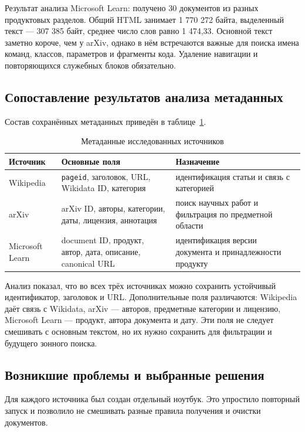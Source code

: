 \documentclass[pdf,unicode,12pt,a4paper,oneside,fleqn]{article}
\begin{document}
Результат анализа Microsoft Learn: получено 30 документов из разных продуктовых
разделов. Общий HTML занимает 1 770 272 байта, выделенный текст --- 307 385 байт,
среднее число слов равно 1 474,33. Основной текст заметно короче, чем у arXiv,
однако в нём встречаются важные для поиска имена команд, классов, параметров и
фрагменты кода. Удаление навигации и повторяющихся служебных блоков обязательно.

\subsection{Сопоставление результатов анализа метаданных}

Состав сохранённых метаданных приведён в таблице~\ref{tab:metadata}.

\begin{table}[htbp]
\centering
\caption{Метаданные исследованных источников}
\label{tab:metadata}
\begin{tabular}{|p{}|p{}|p{}|}
\hline
\textbf{Источник} & \textbf{Основные поля} & \textbf{Назначение} \\
\hline
Wikipedia & \texttt{pageid}, заголовок, URL, Wikidata ID, категория &
идентификация статьи и связь с категорией \\
\hline
arXiv & arXiv ID, авторы, категории, даты, лицензия, аннотация &
поиск научных работ и фильтрация по предметной области \\
\hline
Microsoft Learn & document ID, продукт, автор, дата, описание, canonical URL &
идентификация версии документа и принадлежности продукту \\
\hline
\end{tabular}
\end{table}

Анализ показал, что во всех трёх источниках можно сохранить устойчивый
идентификатор, заголовок и URL. Дополнительные поля различаются: Wikipedia даёт
связь с Wikidata, arXiv --- авторов, предметные категории и лицензию, Microsoft
Learn --- продукт, автора документа и дату. Эти поля не следует смешивать с
основным текстом, но их нужно сохранить для фильтрации и будущего зонного поиска.

\subsection{Возникшие проблемы и выбранные решения}

Для каждого источника был создан отдельный ноутбук. Это упростило повторный
запуск и позволило не смешивать разные правила получения и очистки документов.
\end{document}
